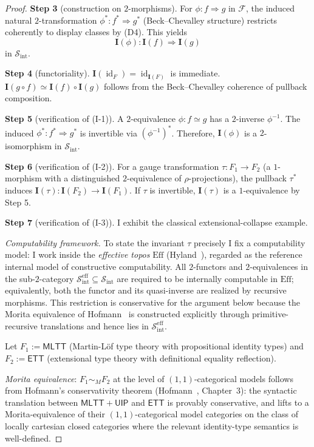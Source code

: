 \documentclass[11pt]{article}
\theoremstyle{plain}
\theoremstyle{definition}
\newcommand{\cS}{\mathcal{S}}
\newcommand{\cF}{\mathcal{F}}
\newcommand{\Sint}{\cS_{\mathrm{int}}}
\newcommand{\MLTT}{\mathsf{MLTT}}
\newcommand{\ETT}{\mathsf{ETT}}
\newcommand{\II}{\mathbf{I}}
\DeclareMathOperator{\id}{id}
\begin{document}
\begin{proof}
\textbf{Step 3} (construction on $2$-morphisms). For $\phi : f \Rightarrow g$ in $\cF$, the induced natural $2$-transformation $\phi^* : f^* \Rightarrow g^*$ (Beck--Chevalley structure) restricts coherently to display classes by (D4). This yields
\[ \II(\phi) : \II(f) \Rightarrow \II(g) \]
in $\Sint$.

\textbf{Step 4} (functoriality). $\II(\id_F) = \id_{\II(F)}$ is immediate. $\II(g \circ f) \simeq \II(f) \circ \II(g)$ follows from the Beck--Chevalley coherence of pullback composition.

\textbf{Step 5} (verification of (I-1)). A $2$-equivalence $\phi : f \simeq g$ has a $2$-inverse $\phi^{-1}$. The induced $\phi^* : f^* \Rightarrow g^*$ is invertible via $(\phi^{-1})^*$. Therefore, $\II(\phi)$ is a $2$-isomorphism in $\Sint$.

\textbf{Step 6} (verification of (I-2)). For a gauge transformation $\tau : F_1 \to F_2$ (a $1$-morphism with a distinguished $2$-equivalence of $\rho$-projections), the pullback $\tau^*$ induces $\II(\tau) : \II(F_2) \to \II(F_1)$. If $\tau$ is invertible, $\II(\tau)$ is a $1$-equivalence by Step 5.

\textbf{Step 7} (verification of (I-3)). I exhibit the classical extensional-collapse example.

\emph{Computability framework.} To state the invariant $\tau$ precisely I fix a computability model: I work inside the \emph{effective topos} $\mathrm{Eff}$ (Hyland~\cite{Hyland1982}), regarded as the reference internal model of constructive computability. All $2$-functors and $2$-equivalences in the sub-$2$-category $\Sint^{\mathrm{eff}} \subseteq \Sint$ are required to be internally computable in $\mathrm{Eff}$; equivalently, both the functor and its quasi-inverse are realized by recursive morphisms. This restriction is conservative for the argument below because the Morita equivalence of Hofmann~\cite{Hofmann1995} is constructed explicitly through primitive-recursive translations and hence lies in $\Sint^{\mathrm{eff}}$.

Let $F_1 := \MLTT$ (Martin-L\"of type theory with propositional identity types) and $F_2 := \ETT$ (extensional type theory with definitional equality reflection).

\emph{Morita equivalence}: $F_1 \sim_M F_2$ at the level of $(1, 1)$-categorical models follows from Hofmann's conservativity theorem (Hofmann~\cite{Hofmann1995}, Chapter~3): the syntactic translation between $\MLTT + \mathsf{UIP}$ and $\ETT$ is provably conservative, and lifts to a Morita-equivalence of their $(1, 1)$-categorical model categories on the class of locally cartesian closed categories where the relevant identity-type semantics is well-defined.


\end{proof}
\end{document}
